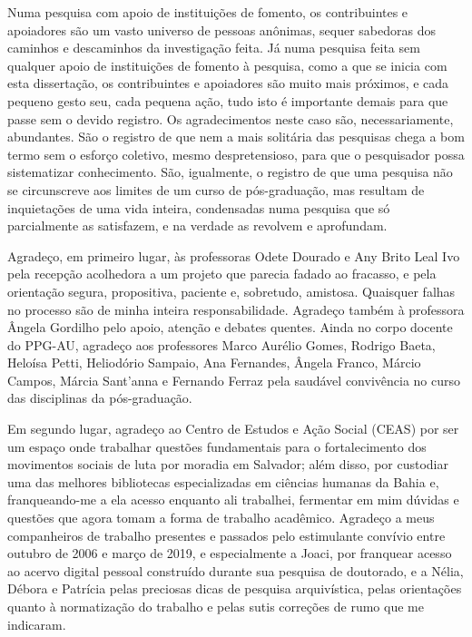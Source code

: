 \begin{agradecimentos}
Numa pesquisa com apoio de instituições de fomento, os contribuintes e apoiadores são um vasto universo de pessoas anônimas, sequer sabedoras dos caminhos e descaminhos da investigação feita. Já numa pesquisa feita sem qualquer apoio de instituições de fomento à pesquisa, como a que se inicia com esta dissertação, os contribuintes e apoiadores são muito mais próximos, e cada pequeno gesto seu, cada pequena ação, tudo isto é importante demais para que passe sem o devido registro. Os agradecimentos neste caso são, necessariamente, abundantes. São o registro de que nem a mais solitária das pesquisas chega a bom termo sem o esforço coletivo, mesmo despretensioso, para que o pesquisador possa sistematizar conhecimento. São, igualmente, o registro de que uma pesquisa não se circunscreve aos limites de um curso de pós-graduação, mas resultam de inquietações de uma vida inteira, condensadas numa pesquisa que só parcialmente as satisfazem, e na verdade as revolvem e aprofundam.

Agradeço, em primeiro lugar, às professoras Odete Dourado e Any Brito Leal Ivo pela recepção acolhedora a um projeto que parecia fadado ao fracasso, e pela orientação segura, propositiva, paciente e, sobretudo, amistosa. Quaisquer falhas no processo são de minha inteira responsabilidade. Agradeço também à professora Ângela Gordilho pelo apoio, atenção e debates quentes. Ainda no corpo docente do PPG-AU, agradeço aos professores Marco Aurélio Gomes, Rodrigo Baeta, Heloísa Petti, Heliodório Sampaio, Ana Fernandes, Ângela Franco, Márcio Campos, Márcia Sant'anna e Fernando Ferraz pela saudável convivência no curso das disciplinas da pós-graduação.

Em segundo lugar, agradeço ao Centro de Estudos e Ação Social (CEAS) por ser um espaço onde trabalhar questões fundamentais para o fortalecimento dos movimentos sociais de luta por moradia em Salvador; além disso, por custodiar uma das melhores bibliotecas especializadas em ciências humanas da Bahia e, franqueando-me a ela acesso enquanto ali trabalhei, fermentar em mim dúvidas e questões que agora tomam a forma de trabalho acadêmico. Agradeço a meus companheiros de trabalho presentes e passados pelo estimulante convívio entre outubro de 2006 e março de 2019, e especialmente a Joaci, por franquear acesso ao acervo digital pessoal construído durante sua pesquisa de doutorado, e a Nélia, Débora e Patrícia pelas preciosas dicas de pesquisa arquivística, pelas orientações quanto à normatização do trabalho e pelas sutis correções de rumo que me indicaram.


\end{agradecimentos}
